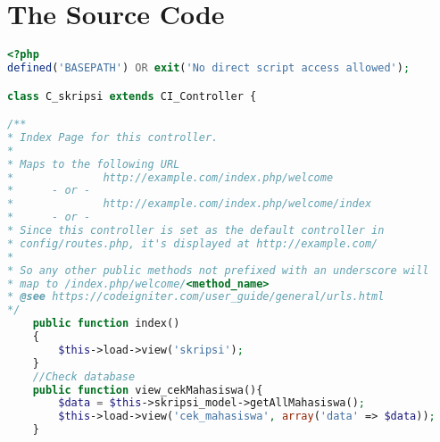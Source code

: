 \chapter{The Source Code}
\label{app:B}

\singlespacing 
%
%
\begin{lstlisting}[language=PHP,basicstyle=\tiny,caption=C\_skripsi.php]
<?php
defined('BASEPATH') OR exit('No direct script access allowed');

class C_skripsi extends CI_Controller {

/**
* Index Page for this controller.
*
* Maps to the following URL
*              http://example.com/index.php/welcome
*      - or -
*              http://example.com/index.php/welcome/index
*      - or -
* Since this controller is set as the default controller in
* config/routes.php, it's displayed at http://example.com/
*
* So any other public methods not prefixed with an underscore will
* map to /index.php/welcome/<method_name>
* @see https://codeigniter.com/user_guide/general/urls.html
*/
	public function index()
	{
		$this->load->view('skripsi');
	}
	//Check database
	public function view_cekMahasiswa(){
		$data = $this->skripsi_model->getAllMahasiswa();
		$this->load->view('cek_mahasiswa', array('data' => $data));
	}
	

\end{lstlisting}
